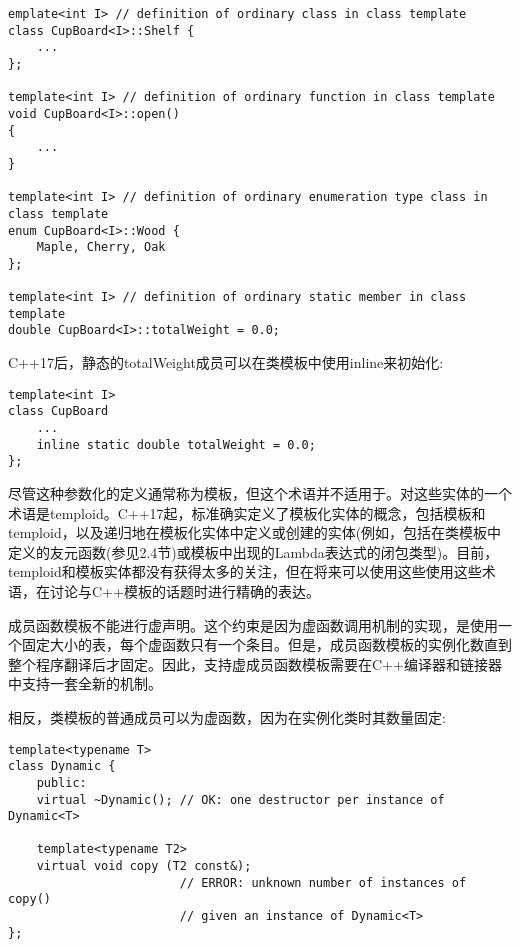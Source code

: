 \begin{lstlisting}[style=styleCXX]
emplate<int I> // definition of ordinary class in class template
class CupBoard<I>::Shelf {
	...
};

template<int I> // definition of ordinary function in class template
void CupBoard<I>::open()
{
	...
}

template<int I> // definition of ordinary enumeration type class in class template
enum CupBoard<I>::Wood {
	Maple, Cherry, Oak
};

template<int I> // definition of ordinary static member in class template
double CupBoard<I>::totalWeight = 0.0;
\end{lstlisting}

C++17后，静态的totalWeight成员可以在类模板中使用inline来初始化:

\begin{lstlisting}[style=styleCXX]
template<int I>
class CupBoard
	...
	inline static double totalWeight = 0.0;
};
\end{lstlisting}

尽管这种参数化的定义通常称为模板，但这个术语并不适用于。对这些实体的一个术语是temploid。C++17起，标准确实定义了模板化实体的概念，包括模板和temploid，以及递归地在模板化实体中定义或创建的实体(例如，包括在类模板中定义的友元函数(参见2.4节)或模板中出现的Lambda表达式的闭包类型)。目前，temploid和模板实体都没有获得太多的关注，但在将来可以使用这些使用这些术语，在讨论与C++模板的话题时进行精确的表达。


成员函数模板不能进行虚声明。这个约束是因为虚函数调用机制的实现，是使用一个固定大小的表，每个虚函数只有一个条目。但是，成员函数模板的实例化数直到整个程序翻译后才固定。因此，支持虚成员函数模板需要在C++编译器和链接器中支持一套全新的机制。

相反，类模板的普通成员可以为虚函数，因为在实例化类时其数量固定:

\begin{lstlisting}[style=styleCXX]
template<typename T>
class Dynamic {
	public:
	virtual ~Dynamic(); // OK: one destructor per instance of Dynamic<T>
	
	template<typename T2>
	virtual void copy (T2 const&);
						// ERROR: unknown number of instances of copy()
						// given an instance of Dynamic<T>
};
\end{lstlisting}


